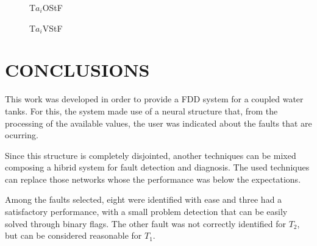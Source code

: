 \documentclass[10pt,fleqn,a4paper]{article}
\begin{document}
\begin{figure}[htb]
    \begin{minipage}[b]{0.48\linewidth}
        \scalebox{0.65}{}
        \vspace{0.5cm}
        \caption{T$a_i$OStF}
        \label{fig:fsieos}
    \end{minipage}
    \hfill
    \begin{minipage}[b]{0.48\linewidth}
        \scalebox{0.65}{}
        \vspace{0.5cm}
        \caption{T$a_i$VStF}
        \label{fig:fsivros}
    \end{minipage}
\end{figure}

\section{CONCLUSIONS}\label{sec:conclusions}
This work was developed in order to provide a FDD system for a coupled water
tanks. For this, the system made use of a neural structure that, from the
processing of the available values, the user was indicated about the faults that
are ocurring.

Since this structure is completely disjointed, another techniques can be mixed
composing a hibrid system for fault detection and diagnosis. The used techniques
can replace those networks whose the performance was below the expectations.

Among the faults selected, eight were identified with ease and three had a
satisfactory performance, with a small problem detection that can be easily
solved through binary flags. The other fault was not correctly identified for
$T_2$, but can be considered reasonable for $T_1$.
\end{document}
